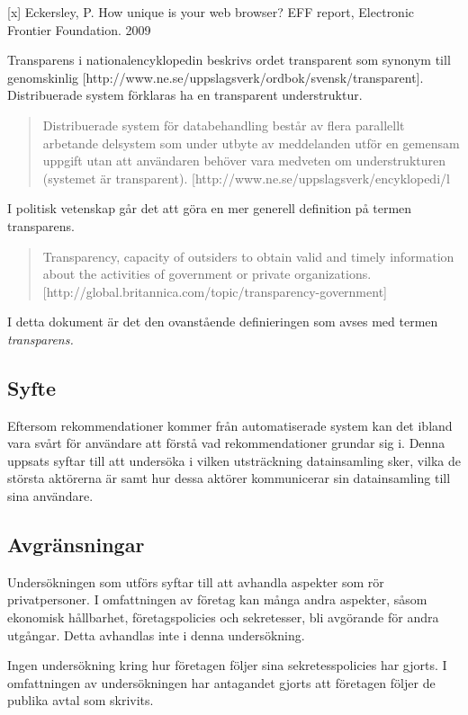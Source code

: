 \documentclass[a4paper,11pt]{article}
\begin{document}
{[x] Eckersley, P. How unique is your web browser? EFF report, Electronic Frontier Foundation. 2009

Transparens i nationalencyklopedin beskrivs ordet transparent som synonym till genomskinlig [http://www.ne.se/uppslagsverk/ordbok/svensk/transparent]. Distribuerade system förklaras ha en transparent understruktur.

\begin{quote}
Distribuerade system för databehandling består av flera parallellt arbetande delsystem som under utbyte av meddelanden utför en gemensam uppgift utan att användaren behöver vara medveten om understrukturen (systemet är transparent). [http://www.ne.se/uppslagsverk/encyklopedi/l%
\end{quote}

I politisk vetenskap går det att göra en mer generell definition på termen transparens. 

\begin{quote}
Transparency, capacity of outsiders to obtain valid and timely information about the activities of government or private organizations.
[http://global.britannica.com/topic/transparency-government]
\end{quote}
I detta dokument är det den ovanstående definieringen som avses med termen \textit{transparens.}

\subsection{Syfte}
Eftersom rekommendationer kommer från automatiserade system kan det ibland vara svårt för användare att förstå vad rekommendationer grundar sig i. Denna uppsats syftar till att undersöka i vilken utsträckning datainsamling sker, vilka de största aktörerna är samt hur dessa aktörer kommunicerar sin datainsamling till sina användare.

\subsection{Avgränsningar}
Undersökningen som utförs syftar till att avhandla aspekter som rör privatpersoner. I omfattningen av företag kan många andra aspekter, såsom ekonomisk hållbarhet,  företagspolicies och sekretesser, bli avgörande för andra utgångar. Detta avhandlas inte i denna undersökning. 

Ingen undersökning kring hur företagen följer sina sekretesspolicies har gjorts. I omfattningen av undersökningen har antagandet gjorts att företagen följer de publika avtal som skrivits. 

}
\end{document}
